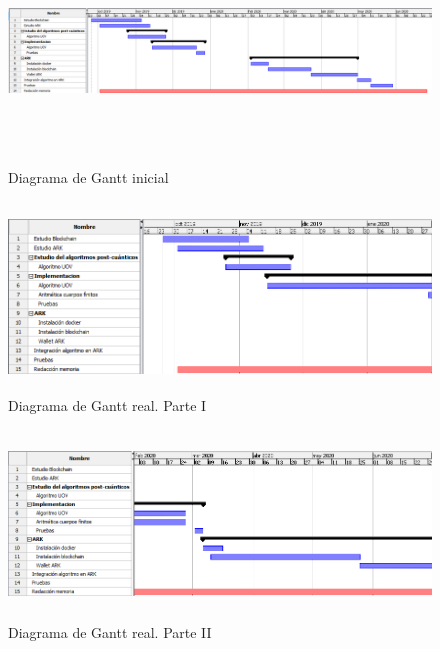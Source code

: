 \begin{landscape}
	\begin{figure}[h]
		\centering
		\hspace*{-2cm}
		\includegraphics[width=20cm,height=6cm]{figuras/Gantt_ini.png}
		\caption{Diagrama de Gantt inicial}
		\label{fig:gantt-ini}
	\end{figure}
\end{landscape}




\begin{figure}[H]
	\centering
	\includegraphics[width=13cm,height=5cm]{figuras/Gantt_1.png}
	\caption{Diagrama de Gantt real. Parte I}
	\label{fig:gantt-real-1}
\end{figure}

\begin{figure}[H]
	\centering
	\includegraphics[width=13cm,height=5cm]{figuras/Gantt_2.png}
	\caption{Diagrama de Gantt real. Parte II}
	\label{fig:gantt-real-2}
\end{figure}

